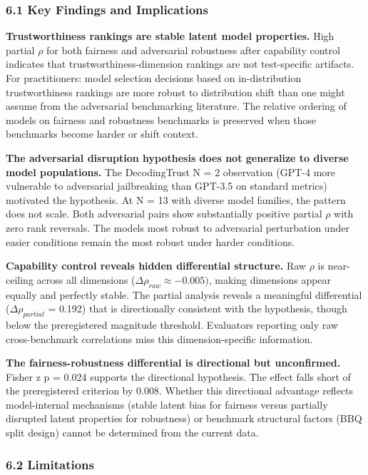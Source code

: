 
\subsubsection{6.1 Key Findings and Implications}

\textbf{Trustworthiness rankings are stable latent model properties.} High partial $\rho$ for both fairness and adversarial robustness after capability control indicates that trustworthiness-dimension rankings are not test-specific artifacts. For practitioners: model selection decisions based on in-distribution trustworthiness rankings are more robust to distribution shift than one might assume from the adversarial benchmarking literature. The relative ordering of models on fairness and robustness benchmarks is preserved when those benchmarks become harder or shift context.

\textbf{The adversarial disruption hypothesis does not generalize to diverse model populations.} The DecodingTrust N = 2 observation (GPT-4 more vulnerable to adversarial jailbreaking than GPT-3.5 on standard metrics) motivated the hypothesis. At N = 13 with diverse model families, the pattern does not scale. Both adversarial pairs show substantially positive partial $\rho$ with zero rank reversals. The models most robust to adversarial perturbation under easier conditions remain the most robust under harder conditions.

\textbf{Capability control reveals hidden differential structure.} Raw $\rho$ is near-ceiling across all dimensions ($\Delta\rho_{raw} \approx -0.005)$, making dimensions appear equally and perfectly stable. The partial analysis reveals a meaningful differential ($\Delta\rho_{partial}$ = 0.192) that is directionally consistent with the hypothesis, though below the preregistered magnitude threshold. Evaluators reporting only raw cross-benchmark correlations miss this dimension-specific information.

\textbf{The fairness-robustness differential is directional but unconfirmed.} Fisher z p = 0.024 supports the directional hypothesis. The effect falls short of the preregistered criterion by 0.008. Whether this directional advantage reflects model-internal mechanisms (stable latent bias for fairness versus partially disrupted latent properties for robustness) or benchmark structural factors (BBQ split design) cannot be determined from the current data.

\subsubsection{6.2 Limitations}

